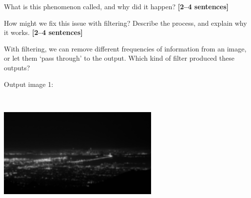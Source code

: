 \documentclass{csci1430}
\begin{document}
\begin{subquestion}[points=3]
What is this phenomenon called, and why did it happen? \textbf{[2--4 sentences]}
\end{subquestion}

\begin{answer}[height=8]

\end{answer}

\begin{subquestion}[points=3]
How might we fix this issue with filtering? Describe the process, and explain why it works. \textbf{[2--4 sentences]}
\end{subquestion}

\begin{answer}[height=8]

\end{answer}

\pagebreak %

\begin{question}[points=7,drawbox=false]
With filtering, we can remove different frequencies of information from an image, or let them `pass through' to the output. Which kind of filter produced these outputs?
\end{question}


\begin{subsubquestion}[points=2]
Output image 1:\\
\includegraphics[width=0.6\textwidth,height=7cm,keepaspectratio]{images/q3img1.png}
\end{subsubquestion}
\end{document}
